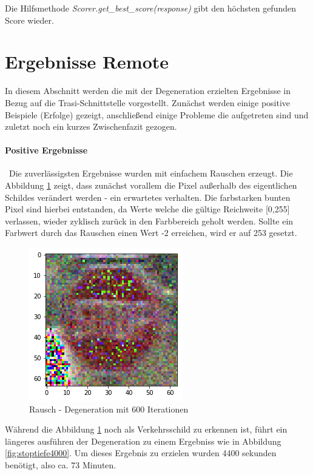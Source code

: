 Die Hilfsmethode \textit{Scorer.get\_best\_score(response)} gibt den höchsten gefunden Score wieder.
\newpage
{}

\section{Ergebnisse Remote}
\label{sec:DegenerationErgebnisse}
In diesem Abschnitt werden die mit der Degeneration erzielten Ergebnisse in Bezug auf die Trasi-Schnittstelle vorgestellt. Zunächst werden einige positive Beispiele (Erfolge) gezeigt, anschließend einige Probleme die aufgetreten sind und zuletzt noch ein kurzes Zwischenfazit gezogen. 
\paragraph{Positive Ergebnisse} ~\newline Die zuverlässigsten Ergebnisse wurden mit einfachem Rauschen erzeugt. Die Abbildung \ref{fig:stoptiefe600} zeigt, dass zunächst vorallem die Pixel außerhalb des eigentlichen Schildes verändert werden - ein erwartetes verhalten. Die farbstarken bunten Pixel sind hierbei entstanden, da Werte welche die gültige Reichweite [0,255] verlassen, wieder zyklisch zurück in den Farbbereich geholt werden. Sollte ein Farbwert durch das Rauschen einen Wert -2 erreichen, wird er auf 253 gesetzt.  

\begin{figure}[h]
	\centering
	\includegraphics[width=0.4\linewidth]{Images/DegenSamples/StopTiefe600}
	\caption[Degeneration Tiefe 600]{Rausch - Degeneration mit 600 Iterationen}
	\label{fig:stoptiefe600}
\end{figure}

Während die Abbildung \ref{fig:stoptiefe600} noch als Verkehrsschild zu erkennen ist, führt ein längeres ausführen der Degeneration zu einem Ergebniss wie in Abbildung \ref{fig:stoptiefe4000}. Um dieses Ergebnis zu erzielen wurden 4400 sekunden benötigt, also ca. 73 Minuten.

